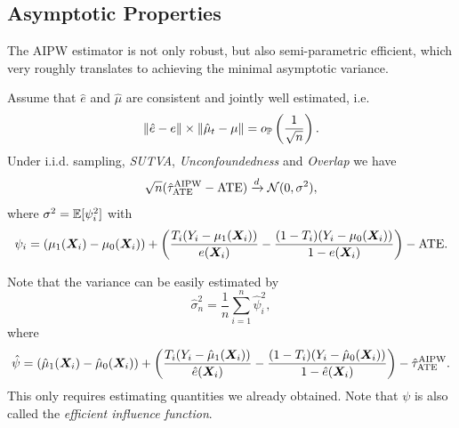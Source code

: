 \documentclass[11pt]{exam}
\begin{document}
\subsection{Asymptotic Properties}
The AIPW estimator is not only robust, but also semi-parametric efficient, which very roughly translates to achieving the minimal asymptotic variance.
\begin{theorem}
    Assume that $\hat e$ and $\hat \mu$ are consistent and jointly well estimated, i.e.
    \[
        \|\hat e - e\| \times \|\hat \mu_t - \mu\| = o_{\mathbb{P}}\left(\frac{1}{\sqrt{n}}\right).
    \]
    Under i.i.d. sampling, \emph{SUTVA}, \emph{Unconfoundedness} and \emph{Overlap} we have 
    \[
        \sqrt{n}(\hat \tau_{\mathrm{ATE}}^{\mathrm{AIPW}} - \mathrm{ATE} ) \xrightarrow{d} \mathcal{N}(0, \sigma^2),
    \]
    where $\sigma^2 = \mathbb{E}[\psi_i^2]$ with
    \[
    \psi_i = \left(\mu_1(\bm{X}_i) - \mu_0(\bm{X}_i)\right) + \left(\frac{T_i (Y_i - \mu_1(\bm{X}_i))}{ e(\bm{X}_i)}- \frac{(1 - T_i) (Y_i - \mu_0(\bm{X}_i))}{1 -  e(\bm{X}_i)}\right) - \mathrm{ATE}.
    \]
\end{theorem}
\noindent
Note that the variance can be easily estimated by
\[
    \hat \sigma_n^2 = \frac{1}{n} \sum_{i=1}^n \hat \psi_i^2,
\]
where 
\[
    \hat \psi = \left(\hat \mu_1(\bm{X}_i) - \hat \mu_0(\bm{X}_i)\right) + \left(\frac{T_i (Y_i - \hat \mu_1(\bm{X}_i))}{\hat e(\bm{X}_i)}- \frac{(1 - T_i) (Y_i - \hat \mu_0(\bm{X}_i))}{1 - \hat e(\bm{X}_i)}\right) - \hat \tau_{\mathrm{ATE}}^{\mathrm{AIPW}}.
\]
This only requires estimating quantities we already obtained. Note that $\psi$ is also called the \emph{efficient influence function}.
\endgroup

\newpage


\end{document}

